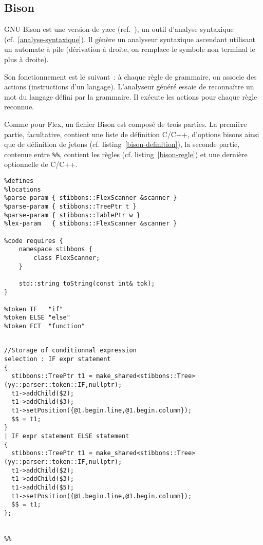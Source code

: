 \subsection{Bison}

GNU Bison est une version de yacc (ref.~\cite{bison}), un outil d'analyse syntaxique (cf.~\ref{analyse-syntaxique}). Il génère un analyseur syntaxique ascendant utilisant un automate à pile (dérivation à droite, on remplace le symbole non terminal le plus à droite).

Son fonctionnement est le suivant~: à chaque règle de grammaire, on associe des actions (instructions d'un langage). L'analyseur généré essaie de reconnaître un mot du langage défini par la grammaire. Il exécute les actions pour chaque règle reconnue.

Comme pour Flex, un fichier Bison est composé de trois parties. La première partie, facultative, contient une liste de définition C/C++, d'options bisons ainsi que de définition de jetons (cf. listing~\ref{bison-definition}), la seconde partie, contenue entre \verb|%%|, contient les règles (cf. listing~\ref{bison-regle}) et une dernière optionnelle de C/C++.

\begin{lstlisting}[label=bison-definition,caption=Definition C++ en bison]
%skeleton "lalr1.cc"
%defines
%locations
%parse-param { stibbons::FlexScanner &scanner }
%parse-param { stibbons::TreePtr t }
%parse-param { stibbons::TablePtr w }
%lex-param   { stibbons::FlexScanner &scanner }

%code requires {
	namespace stibbons {
		class FlexScanner;
	}

	std::string toString(const int& tok);
}

%token IF   "if"
%token ELSE "else" 
%token FCT  "function"
\end{lstlisting}

\begin{lstlisting}[label=bison-regle,caption=Règles de grammaire en bison]
%%

//Storage of conditionnal expression
selection : IF expr statement 
{
  stibbons::TreePtr t1 = make_shared<stibbons::Tree>(yy::parser::token::IF,nullptr);
  t1->addChild($2);
  t1->addChild($3);
  t1->setPosition({@1.begin.line,@1.begin.column});
  $$ = t1;
}
| IF expr statement ELSE statement
{
  stibbons::TreePtr t1 = make_shared<stibbons::Tree>(yy::parser::token::IF,nullptr);
  t1->addChild($2);
  t1->addChild($3);
  t1->addChild($5);
  t1->setPosition({@1.begin.line,@1.begin.column});
  $$ = t1;
};


%%
\end{lstlisting}

